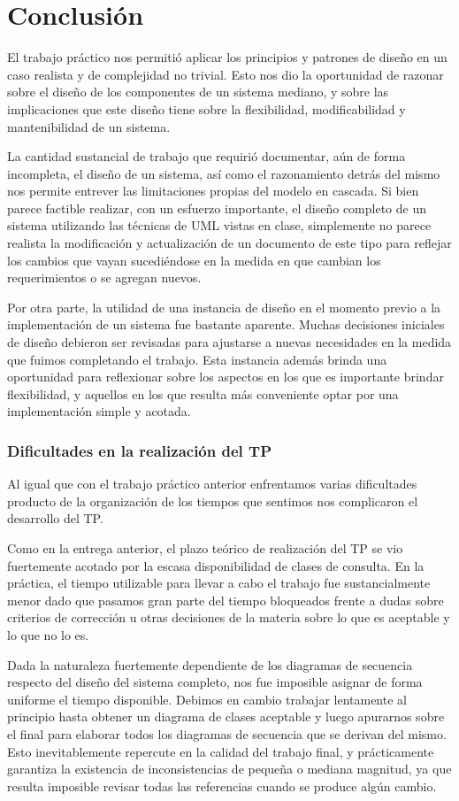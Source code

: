 \chapter{Conclusión}

El trabajo práctico nos permitió aplicar los principios y patrones de diseño
en un caso realista y de complejidad no trivial. Esto nos dio la oportunidad de
razonar sobre el diseño de los componentes de un sistema mediano, y sobre
las implicaciones que este diseño tiene sobre la flexibilidad, modificabilidad y
mantenibilidad de un sistema.

La cantidad sustancial de trabajo que requirió documentar, aún de forma 
incompleta, el diseño de un sistema, así como el razonamiento detrás del
mismo nos permite entrever las limitaciones propias del modelo en cascada.
Si bien parece factible realizar, con un esfuerzo importante, el diseño 
completo de un sistema utilizando las técnicas de UML vistas en clase,
simplemente no parece realista la modificación y actualización de un documento
de este tipo para reflejar los cambios que vayan sucediéndose en la medida
en que cambian los requerimientos o se agregan nuevos.

Por otra parte, la utilidad de una instancia de diseño en el momento
previo a la implementación de un sistema fue bastante aparente. Muchas
decisiones iniciales de diseño debieron ser revisadas para ajustarse a
nuevas necesidades en la medida que fuimos completando el trabajo.
Esta instancia además brinda una oportunidad para reflexionar sobre
los aspectos en los que es importante brindar flexibilidad, y aquellos
en los que resulta más conveniente optar por una implementación simple
y acotada.

\subsection{Dificultades en la realización del TP}

Al igual que con el trabajo práctico anterior enfrentamos varias
dificultades producto de la organización de los tiempos que sentimos
nos complicaron el desarrollo del TP.

Como en la entrega anterior, el plazo teórico de realización del TP se
vio fuertemente acotado por la escasa disponibilidad de clases de consulta.
En la práctica, el tiempo utilizable para llevar a cabo el trabajo fue
sustancialmente menor dado que pasamos gran parte del tiempo bloqueados
frente a dudas sobre criterios de corrección u otras decisiones de la
materia sobre lo que es aceptable y lo que no lo es.

Dada la naturaleza fuertemente dependiente de los diagramas de secuencia
respecto del diseño del sistema completo, nos fue imposible asignar de forma
uniforme el tiempo disponible. Debimos en cambio trabajar lentamente al
principio  hasta obtener un diagrama de clases aceptable y luego apurarnos
sobre el final para elaborar todos los diagramas de secuencia que se derivan
del mismo. Esto inevitablemente repercute en la calidad del trabajo final,
y prácticamente garantiza la existencia de inconsistencias de pequeña o 
mediana magnitud, ya que resulta imposible revisar todas las referencias
cuando se produce algún cambio.
